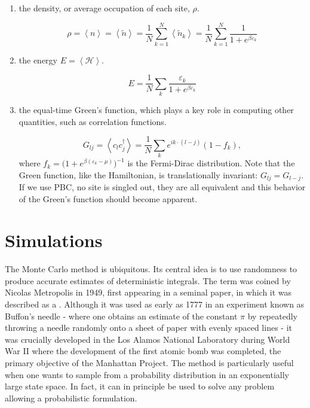 \documentclass[10pt, twocolumn, twoside]{article}
\begin{document}
\begin{enumerate}
\item the density, or average occupation of each site, $\rho$.

\begin{equation}
\rho = \left\langle n \right\rangle = \left\langle \tilde{n} \right\rangle = \frac{1}{N} \sum_{k=1}^N \left\langle \tilde{n}_k \right\rangle  = \frac{1}{N} \sum_{k=1}^N  \frac{1}{1 + e^{\beta\varepsilon_k}}
\end{equation}

\item the energy $E = \left\langle \mathcal{H} \right\rangle$.

\begin{equation}
E = \frac{1}{N} \sum_k \frac{\varepsilon_k}{1 + e^{\beta\varepsilon_k}}
\end{equation}

\item the equal-time Green's function, which plays a key role in computing other quantities, such as correlation functions.

\begin{equation}
G_{lj} = \left\langle c_l c_j^\dagger \right\rangle = \frac{1}{N} \sum_k e^{ i k \cdot ( l - j ) } ( 1 - f_k ),
\end{equation}
where $f_k = \big(1 + e^{\beta(\varepsilon_k - \mu)} \big)^{-1}$ is the Fermi-Dirac distribution. Note that the Green function, like the Hamiltonian, is translationally invariant: $G_{lj} = G_{l-j}$. If we use PBC, no site is singled out, they are all equivalent and this behavior of the Green's function should become apparent.
\end{enumerate}

\section{Simulations}\label{hubbQMC}\paragraph{}

The Monte Carlo method is ubiquitous. Its central idea is to use randomness to produce accurate estimates of deterministic integrals. The term was coined by Nicolas Metropolis in 1949, first appearing in a seminal paper, in which it was described as a \cite{Metropolis1949}. Although it was used as early as 1777 in an experiment known as Buffon's needle - where one obtains an estimate of the constant $\pi$ by repeatedly throwing  a needle randomly onto a sheet of paper with evenly spaced lines - it was crucially developed in the Los Alamos National Laboratory during World War II where the development of the first atomic bomb was completed, the primary objective of the Manhattan Project. The method is particularly useful when one wants to sample from a probability distribution in an exponentially large state space. In fact, it can in principle be used to solve any problem allowing a probabilistic formulation.
\end{document}
